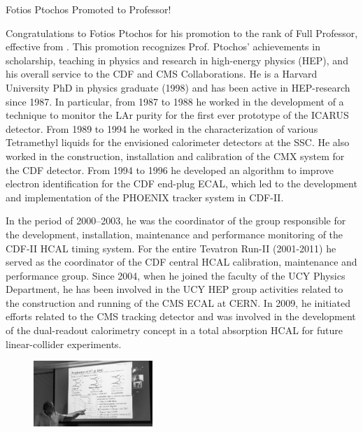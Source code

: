 \begin{headline}[enhanced, tikz={rotate=0}, width=0.5\textwidth]{Fotios Ptochos Promoted to Professor!}
\begin{multicols}{2}
    Congratulations to Fotios Ptochos for his promotion to the rank of
    Full Professor, effective from \MyDate. This promotion recognizes
    Prof. Ptochos' achievements in scholarship, teaching in physics
    and research in high-energy physics (HEP), and his overall service
    to the CDF and CMS Collaborations. He is a Harvard University PhD
    in physics graduate (1998) and has been active in HEP-research
    since 1987. In particular, from 1987 to 1988 he worked in the
    development of a technique to monitor the LAr purity for the first
    ever prototype of the ICARUS detector. From 1989 to 1994 he worked
    in the characterization of various Tetramethyl liquids for the
    envisioned calorimeter detectors at the SSC. He also
    worked in the construction, installation and calibration of the
    CMX system for the CDF detector. From 1994 to 1996 he developed an algorithm to improve
    electron identification for the CDF end-plug ECAL, which led to
    the development and implementation of the PHOENIX tracker system
    in CDF-II.

    In the period of 2000–2003, he was the coordinator of the group
    responsible for the development, installation, maintenance and
    performance monitoring of the CDF-II HCAL timing system. For the entire Tevatron Run-II
    (2001-2011) he served as the coordinator of the CDF central HCAL
    calibration, maintenance and performance group. Since
    2004, when he joined the faculty of the UCY Physics Department, he has
    been involved in the UCY HEP group activities related to the
    construction and running of the CMS ECAL at CERN. In 2009, he
    initiated efforts related to the CMS tracking detector and was
    involved in the development of the dual-readout calorimetry
    concept in a total absorption HCAL for future linear-collider experiments. 

    \begin{figure}
      \begin{center}
        \leavevmode
        \includegraphics[width=0.4\textwidth]{./figures/Fotis7.png}
      \end{center}
    \end{figure}


\end{multicols}
\end{headline}
